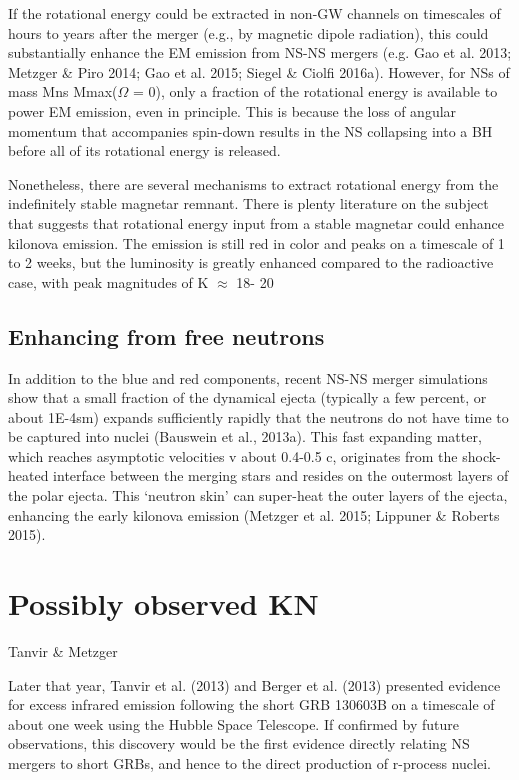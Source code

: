 If the rotational energy could be extracted in non-GW channels on timescales of hours to years after the merger (e.g., by magnetic dipole radiation), this could substantially enhance the EM emission from NS-NS mergers (e.g. Gao et al. 2013; Metzger \& Piro 2014; Gao et al. 2015; Siegel \& Ciolfi 2016a). However, for NSs of mass Mns   Mmax($\Omega$ = 0), only a fraction of the rotational energy is available to power EM emission, even in principle. This is because the loss of angular momentum that accompanies spin-down results in the NS collapsing into a BH before all of its rotational energy is released.

Nonetheless, there are several mechanisms to extract rotational energy from the indefinitely stable magnetar remnant.
There is plenty literature on the subject that suggests that rotational energy input from a stable magnetar could enhance kilonova emission. The emission is still red in color and peaks on a timescale of 1 to 2 weeks, but the luminosity is greatly enhanced compared to the radioactive case, with peak magnitudes of K $\approx$ 18- 20

\subsection{Enhancing from free neutrons}

In addition to the blue and red components, recent NS-NS merger simulations show that a small fraction of the dynamical ejecta (typically a few percent, or about 1E-4sm) expands sufficiently rapidly that the neutrons do not have time to be captured into nuclei (Bauswein et al., 2013a). This fast expanding matter, which reaches asymptotic velocities v about 0.4-0.5 c, originates from the shock- heated interface between the merging stars and resides on the outermost layers of the polar ejecta. This `neutron skin' can super-heat the outer layers of the ejecta, enhancing the early kilonova emission (Metzger et al. 2015; Lippuner \& Roberts 2015).

\section{Possibly observed KN}

Tanvir \& Metzger

Later that year, Tanvir et al. (2013) and Berger et al. (2013) presented evidence for excess infrared emission following the short GRB 130603B on a timescale of about one week using the Hubble Space Telescope. If confirmed by future observations, this discovery would be the first evidence directly relating NS mergers to short GRBs, and hence to the direct production of r-process nuclei.

